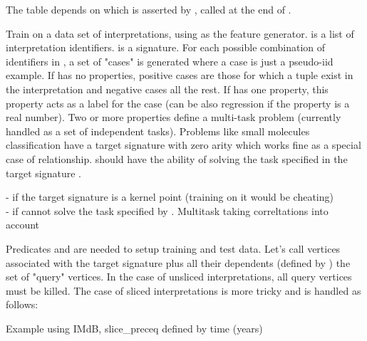 \begin{description}
\begin{enumerate}
The table depends on  which is asserted by
, called at the end of .
\end{enumerate}

Train  on a data set of interpretations, using
 as the feature generator.  is a list of
interpretation identifiers.  is a signature. For each possible
combination of identifiers in , a set of "cases" is generated where
a case is just a pseudo-iid example. If  has no properties,
positive cases are those for which a tuple exist in the
interpretation and negative cases all the rest. If  has one
property, this property acts as a label for the case (can be also
regression if the property is a real number). Two or more properties
define a multi-task problem (currently handled as a set of
independent tasks). Problems like small molecules classification
have a target signature with zero arity which works fine as a
special case of relationship.  should have the ability of
solving the task specified in the target signature .

\begin{tags}
- if the target signature is a kernel point (training on it would be cheating) \\- if  cannot solve the task specified by .
Multitask taking correltations into account
\end{tags}

Predicates  and  are needed to setup training and
test data. Let's
call vertices associated with the target signature plus all their
dependents (defined by ) the set of "query"
vertices. In the case of unsliced interpretations, all query
vertices must be killed. The case of sliced interpretations is more
tricky and is handled as follows:

Example using IMdB, slice_preceq defined by time (years)


\end{description}
